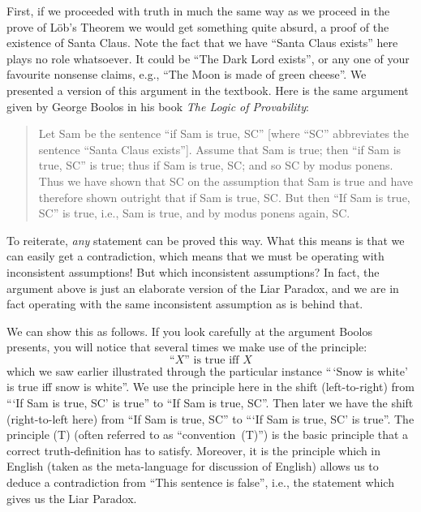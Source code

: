 First,  if we proceeded with truth in much the same way as we proceed
in the prove of L\"ob's Theorem we would get something quite absurd, a
proof of the existence of Santa Claus. Note the fact that we have
``Santa Claus exists'' here plays no role whatsoever. It could be
``The Dark Lord exists'', or any one of your favourite nonsense
claims, e.g., ``The Moon is made of green cheese''. We presented a
version of this argument in the textbook. Here is the same argument
given by George Boolos in his book \emph{The Logic of Provability}:
\begin{quote} 
Let Sam be the sentence ``if Sam is true, SC'' [where ``SC''
abbreviates the sentence ``Santa Claus exists'']. Assume that Sam is
true; then ``if Sam is true, SC'' is true; thus if Sam is true, SC;
and so SC by modus ponens. Thus we have shown that SC on the
assumption that Sam is true and have therefore shown outright that if
Sam is true, SC. But then ``If Sam is true, SC'' is true, i.e., Sam is
true, and by modus ponens again, SC. \citep[p.~56]{Boolos1993}
\end{quote}
To reiterate,  \emph{any} statement can be proved this way. What this
means is that we can easily get a contradiction, which means that we
must be operating with inconsistent assumptions! But which
inconsistent assumptions? In fact, the argument above is just an
elaborate version of the Liar Paradox, and we are in fact operating
with the same inconsistent assumption as is behind that.

We can show this as follows. If you look carefully at the argument
Boolos presents, you will notice that several times we make use of the
principle:
\begin{equation*}\label{eqn:convention-t}
\text{``$X$'' is true iff $X$}\tag{T}
\end{equation*}
which we saw earlier illustrated through the particular instance
``\,`Snow is white' is true iff snow is white''. We use the principle
here in the shift (left-to-right) from ``{}`If Sam is true, SC' is
true'' to ``If Sam is true, SC''. Then later we have the shift
(right-to-left here) from ``If Sam is true, SC'' to ``{}`If Sam is
true, SC' is true''. The principle (T) (often referred to as
``convention~(T)'') is the  basic principle that a correct
truth-definition has to satisfy. Moreover, it is the principle which
in English (taken as the meta-language for discussion of English)
allows us to deduce a contradiction from ``This sentence is false'',
i.e., the statement which gives us the Liar Paradox. 

